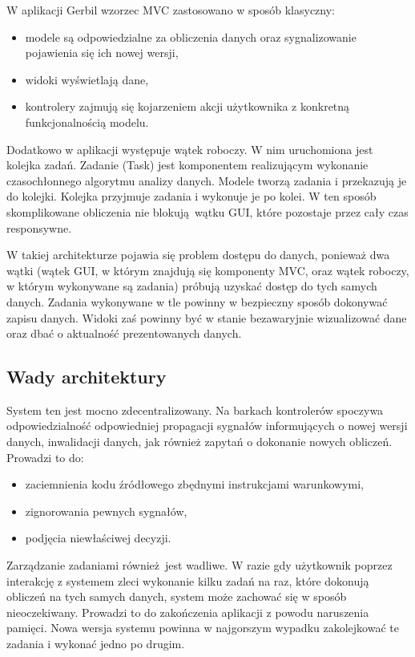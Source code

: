 W aplikacji Gerbil wzorzec MVC zastosowano w sposób klasyczny: 
\begin{itemize}
	\item modele są odpowiedzialne za obliczenia danych oraz sygnalizowanie pojawienia się ich nowej wersji,
	\item widoki wyświetlają dane,
	\item kontrolery zajmują się kojarzeniem akcji użytkownika z konkretną funkcjonalnością modelu.
\end{itemize}

Dodatkowo w aplikacji występuje wątek roboczy. W nim uruchomiona jest kolejka zadań. Zadanie (Task) jest komponentem realizującym wykonanie czasochłonnego algorytmu analizy danych. Modele tworzą zadania i przekazują je do kolejki. Kolejka przyjmuje zadania i wykonuje je po kolei. W ten sposób skomplikowane obliczenia nie blokują wątku GUI, które pozostaje przez cały czas responsywne.

W takiej architekturze pojawia się problem dostępu do danych, ponieważ dwa wątki (wątek GUI, w którym znajdują się komponenty MVC, oraz wątek roboczy, w którym wykonywane są zadania) próbują uzyskać dostęp do tych samych danych. Zadania wykonywane w tle powinny w bezpieczny sposób dokonywać zapisu danych. Widoki zaś powinny być w stanie bezawaryjnie wizualizować dane oraz dbać o aktualność prezentowanych danych.

\subsection{Wady architektury}

System ten jest mocno zdecentralizowany. Na barkach kontrolerów spoczywa odpowiedzialność odpowiedniej propagacji sygnałów informujących o nowej wersji danych, inwalidacji danych, jak również zapytań o dokonanie nowych obliczeń. Prowadzi to do:
\begin{itemize}
	\item zaciemnienia kodu źródłowego zbędnymi instrukcjami warunkowymi,
	\item zignorowania pewnych sygnałów,
	\item podjęcia niewłaściwej decyzji.
\end{itemize}

Zarządzanie zadaniami również jest wadliwe. W razie gdy użytkownik poprzez interakcję z systemem zleci wykonanie kilku zadań na raz, które dokonują obliczeń na tych samych danych, system może zachować się w sposób nieoczekiwany. Prowadzi to do zakończenia aplikacji z powodu naruszenia pamięci. Nowa wersja systemu powinna w najgorszym wypadku zakolejkować te zadania i wykonać jedno po drugim.

